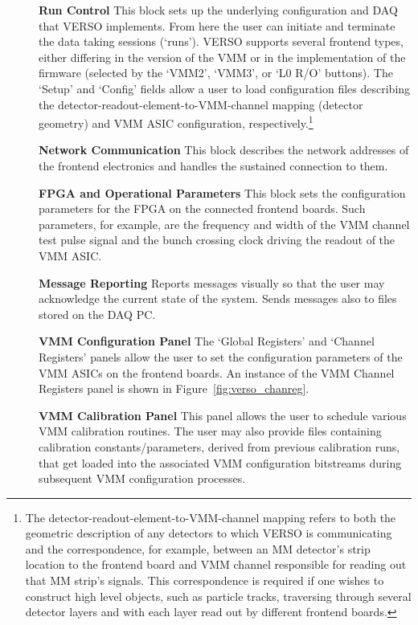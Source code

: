 \begin{description}
    \item[] \textbf{Run Control} This block sets up the underlying configuration and DAQ
        that VERSO implements.
        From here the user can initiate and terminate the data taking sessions (`runs').
        VERSO supports several frontend types, either differing in the version of the VMM or in the
            implementation of the firmware (selected by the `VMM2', `VMM3', or `L0 R/O' buttons).
        The `Setup' and `Config' fields allow a user to load configuration files describing
            the detector-readout-element-to-VMM-channel mapping (detector geometry) and VMM ASIC configuration, respectively.\footnote{
                The detector-readout-element-to-VMM-channel mapping refers to both the geometric description
                of any detectors to which VERSO is communicating and the correspondence, for example, between an MM detector's
                strip location to the frontend board and VMM channel responsible for reading out that MM strip's signals.
                This correspondence is required if one wishes to construct high level objects, such as
                particle tracks, traversing through several detector layers and with each layer read out
                by different frontend boards.
            }
    \item[] \textbf{Network Communication} This block describes the network addresses of the
        frontend electronics and handles the sustained connection to them.
    \item[] \textbf{FPGA and Operational Parameters} This block sets the configuration parameters
            for the FPGA on the connected frontend boards. Such parameters, for example,
            are the frequency and width of the VMM channel test pulse signal and the bunch
            crossing clock driving the readout of the VMM ASIC.
    \item[] \textbf{Message Reporting} Reports messages visually so that the user may acknowledge
            the current state of the system. Sends messages also to files stored on the DAQ PC.
    \item[] \textbf{VMM Configuration Panel} The `Global Registers' and `Channel Registers' panels allow
        the user to set the configuration parameters of the VMM ASICs on the frontend boards.
        An instance of the VMM Channel Registers panel is shown in Figure~\ref{fig:verso_chanreg}.
    \item[] \textbf{VMM Calibration Panel} This panel allows the user to schedule various VMM calibration routines.
        The user may also provide files containing calibration constants/parameters, derived from previous
        calibration runs, that get loaded into the associated VMM configuration
        bitstreams during subsequent VMM configuration processes.
\end{description}

